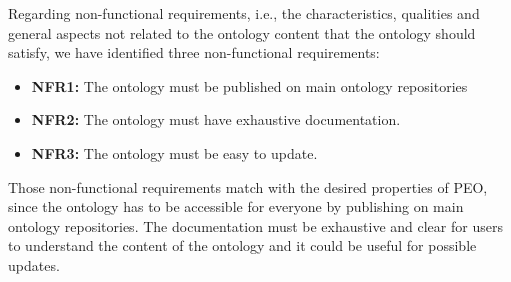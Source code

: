 Regarding non-functional requirements, i.e., the characteristics, qualities and general aspects not related to the ontology content that the ontology should satisfy, we have identified three non-functional requirements:
\begin{itemize}
    \item \textbf{NFR1:} The ontology must be published on main ontology repositories
    \item \textbf{NFR2:} The ontology must have exhaustive documentation.
    \item \textbf{NFR3:} The ontology must be easy to update.
\end{itemize}
Those non-functional requirements match with the desired properties of PEO, since the ontology has to be accessible for everyone by publishing on main ontology repositories. The documentation  must be exhaustive and clear for users to understand the content of the ontology and it could be useful for possible updates.





